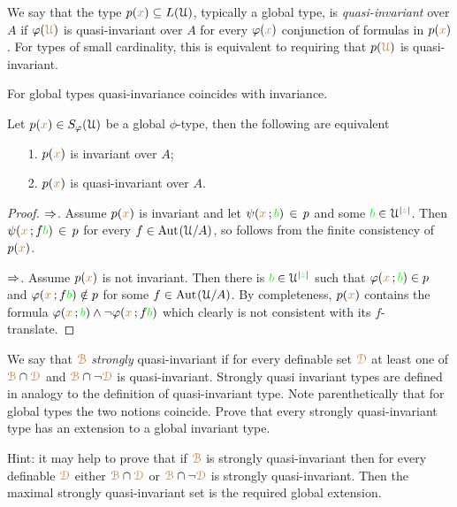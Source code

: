\documentclass[creche.tex]{subfiles}
\begin{document}
We say that the type $p({\color{brown} x})\subseteq L(\EuScript U)$, typically a global type, is \emph{quasi-invariant\/} over $A$ if $\varphi({\color{brown}\EuScript U})$ is quasi-invariant over $A$  for every $\varphi({\color{brown} x})$ conjunction of formulas in $p({\color{brown} x})$. For types of small cardinality, this is equivalent to requiring that $p({\color{brown}\EuScript U})$ is quasi-invariant.%

For global types quasi-invariance coincides with invariance. 

\begin{proposition}\label{prop_invariance-quasi-invariance}
Let $p({\color{brown} x})\in S_{\varphi}(\EuScript U)$ be a global $\phi$-type, then the following are equivalent
\begin{itemize}
\item[1.] $p({\color{brown} x})$ is invariant over $A$;
\item[2.] $p({\color{brown} x})$ is quasi-invariant over $A$.
\end{itemize}
\end{proposition}
\begin{proof}
$\Rightarrow$. Assume $p({\color{brown} x})$ is invariant and let $\psi({\color{brown} x}\,;{\color{green} b})\,\in\, p$ and some ${\color{green} b}\in\EuScript U^{|{\color{green} z}|}$. Then $\psi({\color{brown} x}\,;f{\color{green} b})\,\in\, p$ for every $f\in\textrm{Aut\kern.15ex}(\EuScript U/A)$, so  follows from the finite consistency of $p({\color{brown} x})$.

$\Rightarrow$. Assume $p({\color{brown} x})$ is not invariant. Then there is ${\color{green} b}\in\EuScript U^{|{\color{green} z}|}$ such that $\varphi({\color{brown} x}\,;{\color{green} b})\in p$ and $\varphi({\color{brown} x}\,;f{\color{green} b})\notin p$ for some  $f\in\textrm{Aut\kern.15ex}(\EuScript U/A)$. By completeness, $p({\color{brown} x})$ contains the formula $\varphi({\color{brown} x}\,;{\color{green} b})\wedge\neg\varphi({\color{brown} x}\,;f{\color{green} b})$ which clearly is not consistent with its $f$-translate.
\end{proof}

\begin{exercise}
We say that ${\color{brown}\EuScript B}$ \textit{strongly\/} quasi-invariant if for every definable set ${\color{brown}\EuScript D}$ at least one of ${\color{brown}\EuScript B}\cap{\color{brown}\EuScript D}$ and ${\color{brown}\EuScript B}\cap\neg{\color{brown}\EuScript D}$ is quasi-invariant. Strongly quasi invariant types are defined in analogy to the definition of quasi-invariant type. Note parenthetically that for global types the two notions coincide. Prove that every strongly quasi-invariant type has an extension to a global invariant type.

Hint: it may help to prove that if ${\color{brown}\EuScript B}$ is strongly quasi-invariant then for every definable ${\color{brown}\EuScript D}$ either ${\color{brown}\EuScript B}\cap{\color{brown}\EuScript D}$ or ${\color{brown}\EuScript B}\cap\neg{\color{brown}\EuScript D}$ is strongly quasi-invariant. Then the maximal strongly quasi-invariant set is the required global extension.\QED
\end{exercise}
\end{document}
